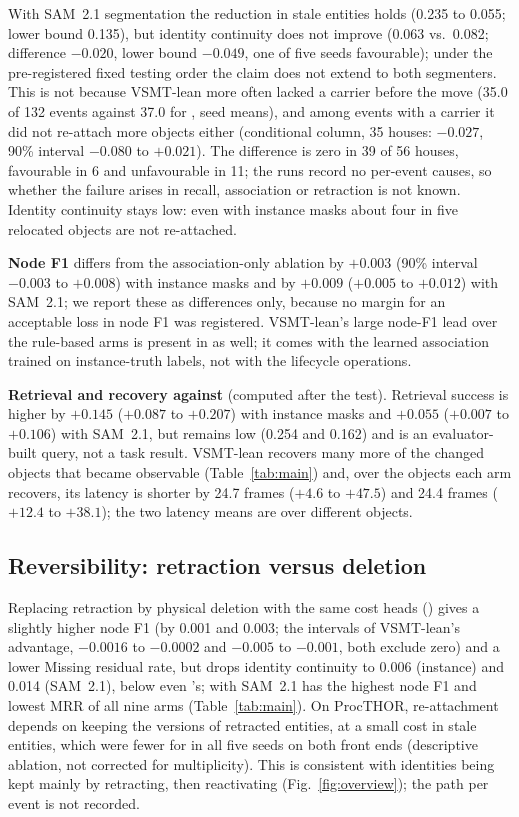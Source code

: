 With SAM~2.1 segmentation the reduction in stale entities holds (0.235 to 0.055; lower bound 0.135), but identity continuity does not improve (0.063 vs.\ 0.082; difference $-0.020$, lower bound $-0.049$, one of five seeds favourable); under the pre-registered fixed testing order the claim does not extend to both segmenters.
This is not because VSMT-lean more often lacked a carrier before the move (35.0 of 132 events against 37.0 for , seed means), and among events with a carrier it did not re-attach more objects either (conditional column, 35 houses: $-0.027$, 90\% interval $-0.080$ to $+0.021$).
The difference is zero in 39 of 56 houses, favourable in 6 and unfavourable in 11; the runs record no per-event causes, so whether the failure arises in recall, association or retraction is not known.
Identity continuity stays low: even with instance masks about four in five relocated objects are not re-attached.

\textbf{Node F1} differs from the association-only ablation by $+0.003$ (90\% interval $-0.003$ to $+0.008$) with instance masks and by $+0.009$ ($+0.005$ to $+0.012$) with SAM~2.1; we report these as differences only, because no margin for an acceptable loss in node F1 was registered.
VSMT-lean's large node-F1 lead over the rule-based arms is present in  as well; it comes with the learned association trained on instance-truth labels, not with the lifecycle operations.

\textbf{Retrieval and recovery against } (computed after the test).
Retrieval success is higher by $+0.145$ ($+0.087$ to $+0.207$) with instance masks and $+0.055$ ($+0.007$ to $+0.106$) with SAM~2.1, but remains low (0.254 and 0.162) and is an evaluator-built query, not a task result.
VSMT-lean recovers many more of the changed objects that became observable (Table~\ref{tab:main}) and, over the objects each arm recovers, its latency is shorter by 24.7 frames ($+4.6$ to $+47.5$) and 24.4 frames ($+12.4$ to $+38.1$); the two latency means are over different objects.

\subsection{Reversibility: retraction versus deletion}
Replacing retraction by physical deletion with the same cost heads () gives a slightly higher node F1 (by 0.001 and 0.003; the intervals of VSMT-lean's advantage, $-0.0016$ to $-0.0002$ and $-0.005$ to $-0.001$, both exclude zero) and a lower Missing residual rate, but drops identity continuity to 0.006 (instance) and 0.014 (SAM~2.1), below even 's; with SAM~2.1  has the highest node F1 and lowest MRR of all nine arms (Table~\ref{tab:main}).
On ProcTHOR, re-attachment depends on keeping the versions of retracted entities, at a small cost in stale entities, which were fewer for  in all five seeds on both front ends (descriptive ablation, not corrected for multiplicity). This is consistent with identities being kept mainly by retracting, then reactivating (Fig.~\ref{fig:overview}); the path per event is not recorded.

